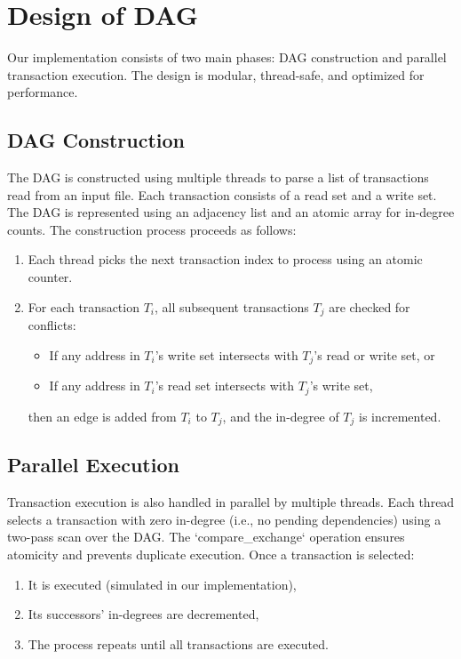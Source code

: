 \documentclass[12pt]{article}
\begin{document}
\section{Design of DAG}

Our implementation consists of two main phases: DAG construction and parallel transaction execution. The design is modular, thread-safe, and optimized for performance.

\subsection{DAG Construction}

The DAG is constructed using multiple threads to parse a list of transactions read from an input file. Each transaction consists of a read set and a write set. The DAG is represented using an adjacency list and an atomic array for in-degree counts. The construction process proceeds as follows:

\begin{enumerate}
    \item Each thread picks the next transaction index to process using an atomic counter.
    \item For each transaction $T_i$, all subsequent transactions $T_j$ are checked for conflicts:
    \begin{itemize}
        \item If any address in $T_i$'s write set intersects with $T_j$'s read or write set, or
        \item If any address in $T_i$'s read set intersects with $T_j$'s write set,
    \end{itemize}
    then an edge is added from $T_i$ to $T_j$, and the in-degree of $T_j$ is incremented.
\end{enumerate}

\subsection{Parallel Execution}

Transaction execution is also handled in parallel by multiple threads. Each thread selects a transaction with zero in-degree (i.e., no pending dependencies) using a two-pass scan over the DAG. The `compare\_exchange` operation ensures atomicity and prevents duplicate execution. Once a transaction is selected:
\begin{enumerate}
    \item It is executed (simulated in our implementation),
    \item Its successors' in-degrees are decremented,
    \item The process repeats until all transactions are executed.
\end{enumerate}
\end{document}
